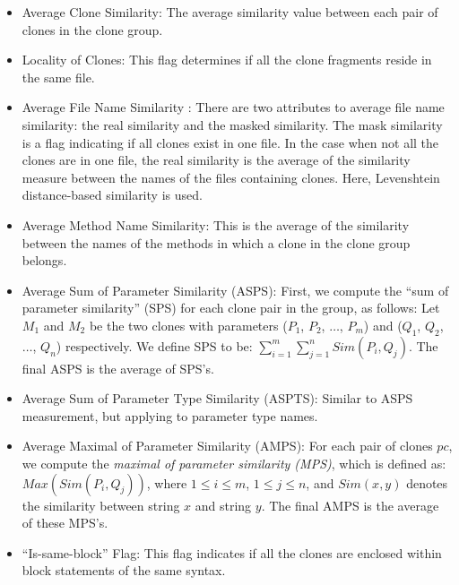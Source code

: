 \begin{itemize}

\item Average Clone Similarity: 
The average similarity value between each pair of clones in the clone group. 

\item Locality of Clones: 
This flag determines if all the clone fragments reside in the same file. 

\item Average File Name Similarity : 
There are two attributes to average file name similarity: the real similarity and the masked similarity. 
The mask similarity is a flag indicating if all clones exist in one file. 
In the case when not all the clones are in one file, the real similarity is the average of the similarity measure between the names of the files containing clones. 
Here, Levenshtein distance-based similarity \cite{Navarro2001} is used. 
  
\item Average Method Name Similarity: 
This is the average of the similarity between the names of the methods in which a clone in the clone group belongs.

\item Average Sum of Parameter Similarity (ASPS): 
First, we compute the ``sum of parameter similarity'' (SPS) for each clone pair in the group, as follows: Let $M_1$ and $M_2$ be the two clones with parameters ($P_1$, $P_2$, $\ldots$, $P_m$) and ($Q_1$, $Q_2$, $\ldots$, $Q_n$) respectively. 
We define SPS to be: $\sum_{i=1}^{m}\sum_{j=1}^{n} \mathit{Sim}(P_i,Q_j)$. 
The final ASPS is the average of SPS's.

\item Average Sum of Parameter Type Similarity (ASPTS): 
Similar to ASPS measurement, but applying to parameter type names.

\item Average Maximal of Parameter Similarity (AMPS): 
For each pair of clones $pc$, we compute the {\em maximal of parameter similarity (MPS)}, which is defined as: $\mathit{Max}(\mathit{Sim}(P_i,Q_j))$, where $1\leq i\leq m$, $1\leq j\leq n$, and $\mathit{Sim}(x, y)$ denotes the similarity between string $x$ and string $y$. 
The final AMPS is the average of these MPS's. 

\item ``Is-same-block'' Flag:  
This flag indicates if all the clones are enclosed within block statements of the same syntax.
\end{itemize}


